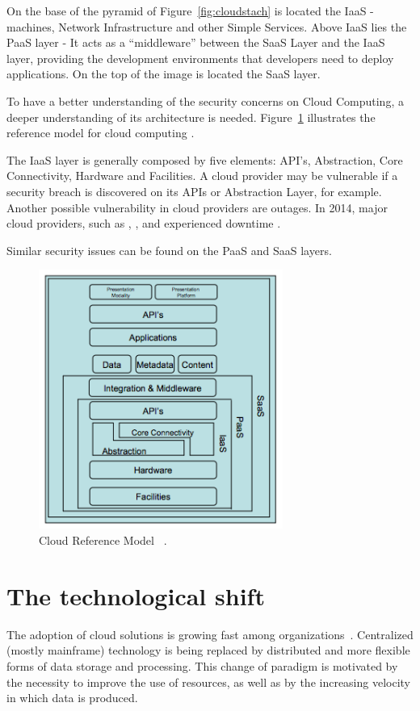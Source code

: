 On the base of the pyramid of Figure~\ref{fig:cloudstach} is located the IaaS - machines, Network Infrastructure and other Simple Services. Above IaaS lies the PaaS layer - It acts as a ``middleware'' between the SaaS Layer and the IaaS layer, providing the development environments that developers need to deploy applications. On the top of the image is located the SaaS layer. 

To have a better understanding of the security concerns on Cloud Computing, a deeper understanding of its architecture is needed. Figure~\ref{fig:cloudmodel} illustrates the reference model for cloud computing \cite{alliance2009}.

The IaaS layer is generally composed by five elements: API's, Abstraction, Core Connectivity, Hardware and Facilities. A cloud provider may be vulnerable if a security breach is discovered on its APIs or Abstraction Layer, for example. Another possible vulnerability in cloud providers are outages. In 2014, major cloud providers, such as \cite{amazonec2}, \cite{azure}, \cite{rackspace} and \cite{GAE} experienced downtime \cite{cloudoutageaudit}.

Similar security issues can be found on the PaaS and SaaS layers.

\begin{figure}[ht!]
\centering
\includegraphics[width=80mm]{Imagens/cloudreferencemodel.png}
\caption{Cloud Reference Model ~\cite{alliance2009}.\label{fig:cloudmodel}}
\end{figure}


\section{The technological shift}
The adoption of cloud solutions is growing fast among organizations~\cite{Armbrust09m.:above}.
Centralized (mostly mainframe) technology is being replaced by distributed and more flexible forms of data storage and processing.
This change of paradigm is motivated by the necessity to improve the use of resources, as well as by the increasing velocity in which data is produced.

